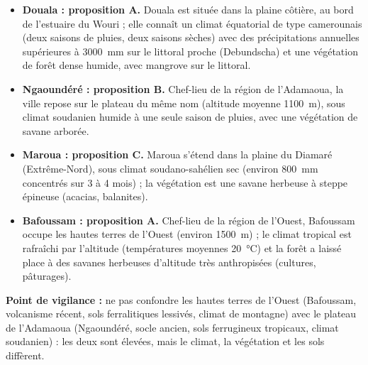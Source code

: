 \documentclass[11pt]{article}
\begin{document}
\begin{corrige}
\begin{itemize}
\item \textbf{Douala : proposition A.} Douala est située dans la plaine côtière, au bord de l'estuaire du Wouri ; elle connaît un climat équatorial de type camerounais (deux saisons de pluies, deux saisons sèches) avec des précipitations annuelles supérieures à \SI{3000}{mm} sur le littoral proche (Debundscha) et une végétation de forêt dense humide, avec mangrove sur le littoral.
\item \textbf{Ngaoundéré : proposition B.} Chef-lieu de la région de l'Adamaoua, la ville repose sur le plateau du même nom (altitude moyenne \SI{1100}{m}), sous climat soudanien humide à une seule saison de pluies, avec une végétation de savane arborée.
\item \textbf{Maroua : proposition C.} Maroua s'étend dans la plaine du Diamaré (Extrême-Nord), sous climat soudano-sahélien sec (environ \SI{800}{mm} concentrés sur 3 à 4 mois) ; la végétation est une savane herbeuse à steppe épineuse (acacias, balanites).
\item \textbf{Bafoussam : proposition A.} Chef-lieu de la région de l'Ouest, Bafoussam occupe les hautes terres de l'Ouest (environ \SI{1500}{m}) ; le climat tropical est rafraîchi par l'altitude (températures moyennes \SI{20}{\celsius}) et la forêt a laissé place à des savanes herbeuses d'altitude très anthropisées (cultures, pâturages).
\end{itemize}
\textbf{Point de vigilance :} ne pas confondre les hautes terres de l'Ouest (Bafoussam, volcanisme récent, sols ferralitiques lessivés, climat de montagne) avec le plateau de l'Adamaoua (Ngaoundéré, socle ancien, sols ferrugineux tropicaux, climat soudanien) : les deux sont élevées, mais le climat, la végétation et les sols diffèrent.
\end{corrige}
\end{document}
